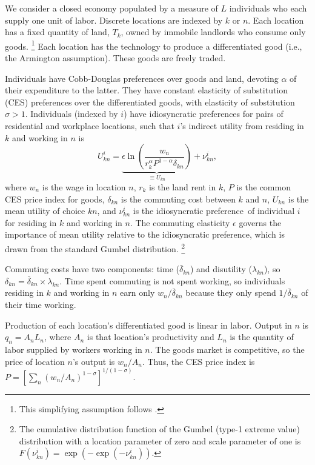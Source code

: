 \documentclass[11pt]{article}
\theoremstyle{definition}
\newcommand\idiosyncraticphrase{idiosyncratic preference}
\begin{document}
We consider a closed economy populated by a measure of $L$ individuals who each supply one unit of labor.
Discrete locations are indexed by $k$ or $n$.
Each location has a fixed quantity of land, $T_k$,
owned by immobile landlords who consume only goods.%
\footnote{This simplifying assumption follows \cite{MonteReddingRossi-Hansberg:2018}.}
Each location has the technology to produce a differentiated good (i.e., the Armington assumption).
These goods are freely traded.

Individuals have Cobb-Douglas preferences over goods and land, devoting $\alpha$ of their expenditure to the latter.
They have constant elasticity of substitution (CES) preferences over the differentiated goods,
with elasticity of substitution $\sigma>1$.
Individuals (indexed by $i$) have idiosyncratic preferences for pairs of residential and workplace locations,
such that
$i$'s indirect utility from residing in $k$ and working in $n$ is
\begin{equation}\label{eqn:utility}
U_{kn}^{i} = \underbrace{\epsilon \ln\left(\frac{w_n}{r_k^\alpha P^{1-\alpha} \delta_{kn}}\right)}_{\equiv U_{kn}} + \nu_{kn}^{i}
,
\end{equation}
where 
$w_n$ is the wage in location $n$, 
$r_k$ is the land rent in $k$,
$P$ is the common CES price index for goods,
$\delta_{kn}$ is the commuting cost between $k$ and $n$,
$U_{kn}$ is the mean utility of choice ${kn}$,
and 
$\nu_{kn}^{i}$ is the \idiosyncraticphrase\ of individual $i$ for residing in $k$ and working in $n$.
The commuting elasticity $\epsilon$ governs the importance of mean utility relative to the \idiosyncraticphrase,
which is drawn from the standard Gumbel distribution.%
\footnote{
	The cumulative distribution function of the Gumbel (type-1 extreme value) distribution
	with a location parameter of zero and scale parameter of one
	is
	$F(\nu_{kn}^{i}) = \exp\left(-\exp\left(-\nu_{kn}^{i}\right)\right)$.
}

Commuting costs have two components: time ($\bar{\delta}_{kn}$) and disutility ($\lambda_{kn}$),
so $\delta_{kn} = \bar{\delta}_{kn} \times \lambda_{kn}$.
Time spent commuting is not spent working, so
individuals residing in $k$ and working in $n$ earn only $w_n/\bar{\delta}_{kn}$
because they only spend $1/\bar{\delta}_{kn}$ of their time working.

Production of each location's differentiated good is linear in labor.
Output in $n$ is $q_n = A_n L_n$,
where
$A_n$ is that location's productivity
and
$L_n$ is the quantity of labor supplied by workers working in $n$.
The goods market is competitive,
so the price of location $n$'s output is $w_n/A_n$.
Thus, the CES price index is 
$P = \left[\sum_{n} \left(w_n/A_n\right)^{1-\sigma}\right]^{1/(1-\sigma)}$.
\end{document}
